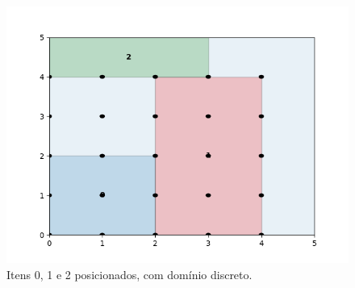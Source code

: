 \begin{figure}[H]
    \centering
    \includegraphics[scale=0.5]{utils/images/discrete_example2}
    \caption{Itens 0, 1 e 2 posicionados, com domínio discreto.}
    \label{fig:sobreposicao-dominio5}
\end{figure}

